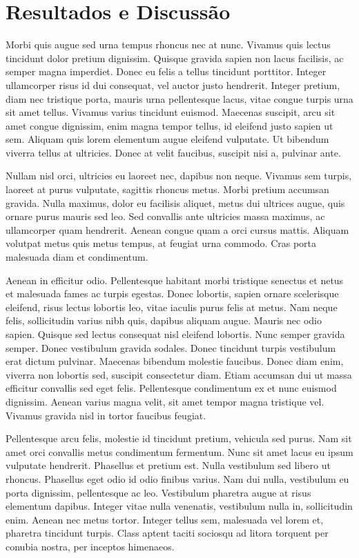\chapter[Resultados e Discussão]{Resultados e Discussão}

Morbi quis augue sed urna tempus rhoncus nec at nunc. Vivamus quis lectus tincidunt dolor pretium dignissim. Quisque gravida sapien non lacus facilisis, ac semper magna imperdiet. Donec eu felis a tellus tincidunt porttitor. Integer ullamcorper risus id dui consequat, vel auctor justo hendrerit. Integer pretium, diam nec tristique porta, mauris urna pellentesque lacus, vitae congue turpis urna sit amet tellus. Vivamus varius tincidunt euismod. Maecenas suscipit, arcu sit amet congue dignissim, enim magna tempor tellus, id eleifend justo sapien ut sem. Aliquam quis lorem elementum augue eleifend vulputate. Ut bibendum viverra tellus at ultricies. Donec at velit faucibus, suscipit nisi a, pulvinar ante.

Nullam nisl orci, ultricies eu laoreet nec, dapibus non neque. Vivamus sem turpis, laoreet at purus vulputate, sagittis rhoncus metus. Morbi pretium accumsan gravida. Nulla maximus, dolor eu facilisis aliquet, metus dui ultrices augue, quis ornare purus mauris sed leo. Sed convallis ante ultricies massa maximus, ac ullamcorper quam hendrerit. Aenean congue quam a orci cursus mattis. Aliquam volutpat metus quis metus tempus, at feugiat urna commodo. Cras porta malesuada diam et condimentum.

Aenean in efficitur odio. Pellentesque habitant morbi tristique senectus et netus et malesuada fames ac turpis egestas. Donec lobortis, sapien ornare scelerisque eleifend, risus lectus lobortis leo, vitae iaculis purus felis at metus. Nam neque felis, sollicitudin varius nibh quis, dapibus aliquam augue. Mauris nec odio sapien. Quisque sed lectus consequat nisl eleifend lobortis. Nunc semper gravida semper. Donec vestibulum gravida sodales. Donec tincidunt turpis vestibulum erat dictum pulvinar. Maecenas bibendum molestie faucibus. Donec diam enim, viverra non lobortis sed, suscipit consectetur diam. Etiam accumsan dui ut massa efficitur convallis sed eget felis. Pellentesque condimentum ex et nunc euismod dignissim. Aenean varius magna velit, sit amet tempor magna tristique vel. Vivamus gravida nisl in tortor faucibus feugiat.

Pellentesque arcu felis, molestie id tincidunt pretium, vehicula sed purus. Nam sit amet orci convallis metus condimentum fermentum. Nunc sit amet lacus eu ipsum vulputate hendrerit. Phasellus et pretium est. Nulla vestibulum sed libero ut rhoncus. Phasellus eget odio id odio finibus varius. Nam dui nulla, vestibulum eu porta dignissim, pellentesque ac leo. Vestibulum pharetra augue at risus elementum dapibus. Integer vitae nulla venenatis, vestibulum nulla in, sollicitudin enim. Aenean nec metus tortor. Integer tellus sem, malesuada vel lorem et, pharetra tincidunt turpis. Class aptent taciti sociosqu ad litora torquent per conubia nostra, per inceptos himenaeos.